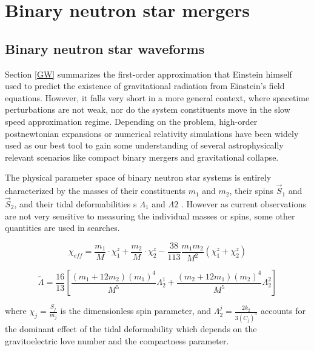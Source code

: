  

\chapter{Binary neutron star mergers}

\section{Binary neutron star waveforms}

Section \ref{GW} summarizes the first-order approximation that Einstein himself used to predict the existence of gravitational radiation from Einstein's field equations. However, it falls very short in a more general context, where spacetime perturbations are not weak, nor do the system constituents move in the slow speed approximation regime. Depending on the problem, high-order postnewtonian expansions or numerical relativity simulations have been widely used as our best tool to gain some understanding of several astrophysically relevant scenarios like compact binary mergers and gravitational collapse. 


The physical parameter space of binary neutron star systems is  entirely characterized by the masses of their constituents $m_1$ and $m_2$, their spins $\vec{S}_1$ and $\vec{S}_2$, and their tidal deformabilities s $\Lambda_1$ and $\Lambda2$ \cite{Hinderer:2009ca}. However as current observations are not very sensitive to measuring the individual masses or spins, some other quantities are used in searches.

\begin{equation}\label{chieff}
\chi_{eff} = \frac{m_1}{M}\cdot \chi_1^z + \frac{m_2}{M}\cdot \chi_2^z - \frac{38}{113} \frac{m_1 m_2}{M^2}(\chi_1^z + \chi_2^z)
\end{equation}


\begin{equation}
\tilde{\Lambda} = \frac{16}{13} \left[ \frac{(m_1 +12m_2)(m_1)^4}{M^5} \Lambda^1_2 + \frac{(m_2 +12m_1)(m_2)^4}{M^5} \Lambda^2_2 \right]
\end{equation}

where $\chi_j = \frac{S_j}{m_j}$ is the dimensionless spin parameter, and $\Lambda^j_2 = \frac{2k_2}{3(C_j)^5}$ accounts for the dominant effect of the tidal deformability  which depends on the gravitoelectric love number and the compactness parameter.


